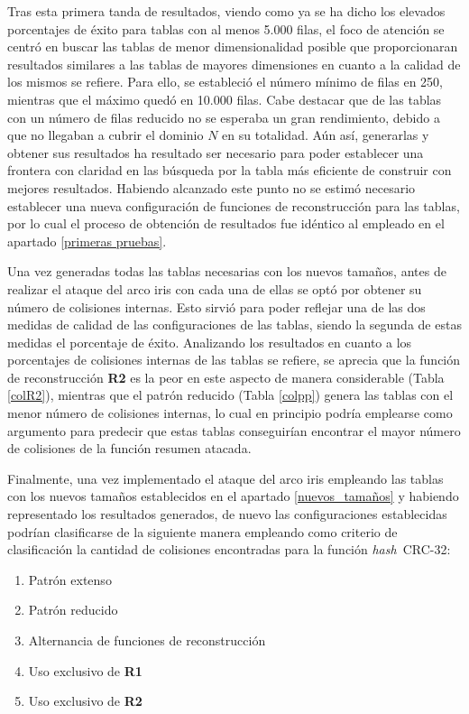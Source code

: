 \documentclass[12pt,spanish,listoffigures,listoftables,listofalgorithms]{tfgetsinf}
\newcommand{\hash}{\textit{hash}}
\begin{document}
Tras esta primera tanda de resultados, viendo como ya se ha dicho los elevados porcentajes de éxito para tablas con al menos 5.000 filas, el foco de atención se centró en buscar las tablas de menor dimensionalidad posible que proporcionaran resultados similares a las tablas de mayores dimensiones en cuanto a la calidad de los mismos se refiere. Para ello, se estableció el número mínimo de filas en 250, mientras que el máximo quedó en 10.000 filas. Cabe destacar que de las tablas con un número de filas reducido no se esperaba un gran rendimiento, debido a que no llegaban a cubrir el dominio $N$ en su totalidad. Aún así, generarlas y obtener sus resultados ha resultado ser necesario para poder establecer una frontera con claridad en las búsqueda por la tabla más eficiente de construir con mejores resultados. Habiendo alcanzado este punto no se estimó necesario establecer una nueva configuración de funciones de reconstrucción para las tablas, por lo cual el proceso de obtención de resultados fue idéntico al empleado en el apartado \ref{primeras pruebas}.

Una vez generadas todas las tablas necesarias con los nuevos tamaños, antes de realizar el ataque del arco iris con cada una de ellas se optó por obtener su número de colisiones internas. Esto sirvió para poder reflejar una de las dos medidas de calidad de las configuraciones de las tablas, siendo la segunda de estas medidas el porcentaje de éxito. Analizando los resultados en cuanto a los porcentajes de colisiones internas de las tablas se refiere, se aprecia que la función de reconstrucción \textbf{R2} es la peor en este aspecto de manera considerable (Tabla \ref{colR2}), mientras que el patrón reducido (Tabla \ref{colpp}) genera las tablas con el menor número de colisiones internas, lo cual en principio podría emplearse como argumento para predecir que estas tablas conseguirían encontrar el mayor número de colisiones de la función resumen atacada.

Finalmente, una vez implementado el ataque del arco iris empleando las tablas con los nuevos tamaños establecidos en el apartado \ref{nuevos_tamaños} y habiendo representado los resultados generados, de nuevo las configuraciones establecidas podrían clasificarse de la siguiente manera empleando como criterio de clasificación la cantidad de colisiones encontradas para la función \hash~CRC-32:

\begin{enumerate}

    \item Patrón extenso
    
    \item Patrón reducido
    
    \item Alternancia de funciones de reconstrucción
    
    \item Uso exclusivo de \textbf{R1}
    
    \item Uso exclusivo de \textbf{R2}
    
\end{enumerate}
\end{document}
